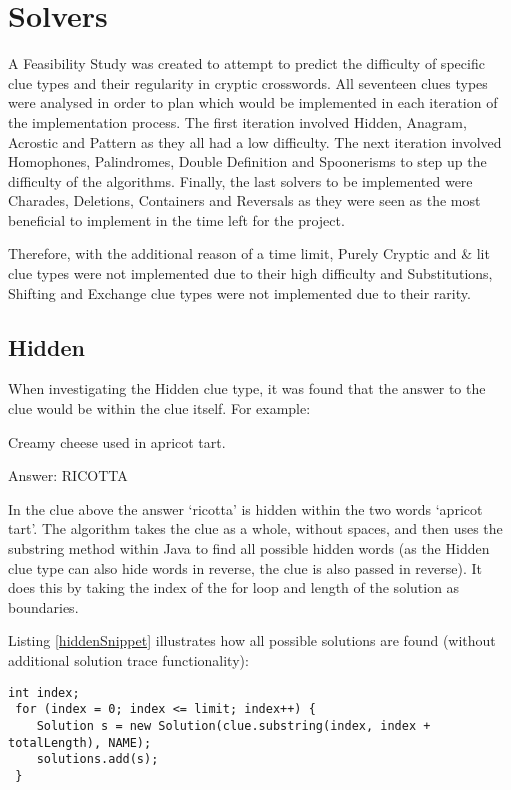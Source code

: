 \section{Solvers}
\label{sec:solvers}

A Feasibility Study was created to attempt to predict the difficulty of specific
clue types and their regularity in cryptic crosswords. All seventeen clues types
were analysed in order to plan which would be implemented in each iteration of
the implementation process. The first iteration involved Hidden, Anagram,
Acrostic and Pattern as they all had a low difficulty. The next iteration
involved Homophones, Palindromes, Double Definition and Spoonerisms to step up
the difficulty of the algorithms. Finally, the last solvers to be implemented
were Charades, Deletions, Containers and Reversals as they were seen as the most
beneficial to implement in the time left for the project.

Therefore, with the additional reason of a time limit,  Purely Cryptic and \&
lit clue types were not implemented due to their high difficulty and
Substitutions, Shifting and Exchange clue types were not implemented due to
their rarity.

\subsection{Hidden}

When investigating the Hidden clue type, it was found that the answer to the
clue would be within the clue itself. For example:

Creamy cheese used in apricot tart.

 
Answer: RICOTTA

In the clue above the answer `ricotta' is hidden within the two words `apricot
tart'. The algorithm takes the clue as a whole, without spaces, and then uses
the substring method  within Java to find all possible hidden words (as the
Hidden clue type can also hide words in reverse, the clue is also passed in
reverse). It does this by taking the index of the for loop and length of the
solution as boundaries.

Listing \ref{hiddenSnippet} illustrates how all possible solutions are found 
(without additional solution trace functionality):

\begin{lstlisting}[caption={INSERT CAPTION},
                   label=hiddenSnippet] 
 int index;
 for (index = 0; index <= limit; index++) {
	Solution s = new Solution(clue.substring(index, index + totalLength), NAME);
	solutions.add(s);
 }
\end{lstlisting}

